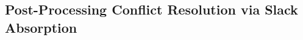 \documentclass[subscriptcorrection,upint,nolists, varvw,barcolor=Goldenrod3,mathalfa=cal=euler,balance,hyphenate,french]{asmejour} %
\begin{document}


\subsection{Post-Processing Conflict Resolution via Slack Absorption}







\end{document}
